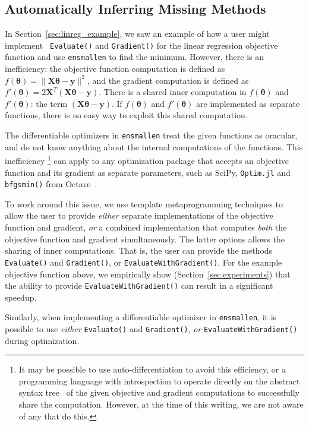\subsection{Automatically Inferring Missing Methods}
\label{sec:automatic}

In Section~\ref{sec:linreg_example}, we saw an example of how a user might implement {\tt
Evaluate()} and {\tt Gradient()} for the linear regression objective function
and use {\tt ensmallen} to find the minimum.
However, there is an inefficiency:
the objective function computation is defined as $f(\bm \theta) = \| \bm X \bm \theta - \bm y \|^2$,
and the gradient computation is defined as $f'(\bm \theta) = 2 \bm X^T (\bm X \bm \theta - \bm y)$.
There is a shared inner computation in $f(\bm \theta)$ and $f'(\bm \theta)$: the
term $(\bm X \bm \theta - \bm y)$.
If $f(\bm \theta)$ and $f'(\bm \theta)$ are implemented as separate functions,
there is no easy way to exploit this shared computation.

The differentiable optimizers in {\tt ensmallen} treat the given functions as oracular,
and do not know anything about the internal computations of the functions.
This inefficiency%
\footnote
  {It may be possible to use auto-differentiation to avoid this efficiency,
  or a programming language with introspection to operate directly on the
  abstract syntax tree~\cite{TODO}  of the given objective and gradient
  computations to successfully share the computation.  However, at the time of
  this writing, we are not aware of any that do this.
  }
can apply to any optimization package that accepts an objective
function and its gradient as separate parameters,
such as SciPy, {\tt Optim.jl} and {\tt bfgsmin()} from Octave~\cite{TODO}.

To work around this issue, we use template metaprogramming techniques to allow
the user to provide {\it either} separate implementations of the objective
function and gradient, {\it or} a combined implementation that computes {\it
both} the objective function and gradient simultaneously.
The latter options allows the sharing of inner computations.
That is, the user can provide the methods {\tt Evaluate()} and {\tt Gradient()},
or {\tt EvaluateWithGradient()}.
For the example objective function above,
we empirically show (Section~\ref{sec:experiments}) that the ability to provide
{\tt EvaluateWithGradient()} can result in a significant speedup.

Similarly, when implementing a differentiable optimizer in {\tt ensmallen},
it is possible to use {\it either} {\tt Evaluate()} and {\tt Gradient()},
{\it or} {\tt EvaluateWithGradient()} during optimization.

